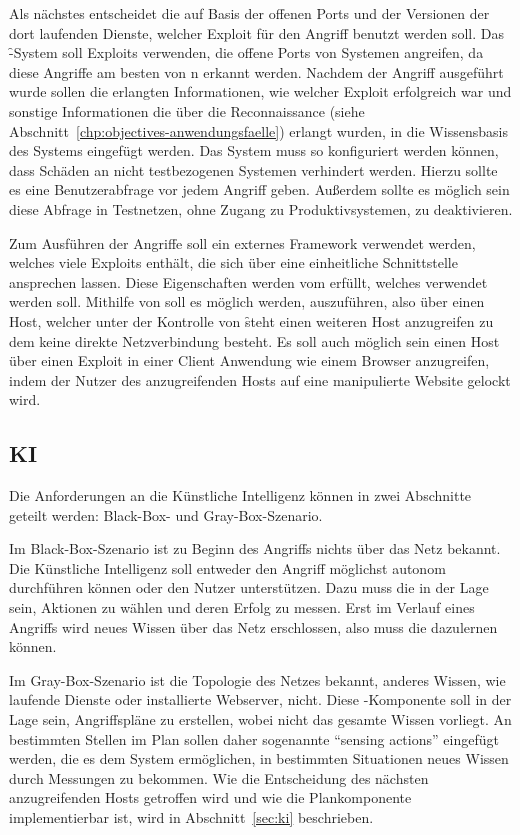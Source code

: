 Als nächstes entscheidet die  auf Basis der offenen Ports und der
Versionen der dort laufenden Dienste, welcher Exploit für den Angriff benutzt werden soll.
Das \f-System soll Exploits verwenden, die offene Ports von Systemen
angreifen, da diese Angriffe am besten von n erkannt werden.
Nachdem der Angriff ausgeführt wurde sollen die erlangten Informationen, wie
welcher Exploit erfolgreich war und sonstige Informationen die über die
Reconnaissance (siehe Abschnitt~\ref{chp:objectives-anwendungsfaelle}) erlangt wurden,
in die Wissensbasis des Systems eingefügt werden.
Das System muss so konfiguriert werden können, dass Schäden an nicht
testbezogenen Systemen verhindert werden. Hierzu sollte es eine Benutzerabfrage
vor jedem Angriff geben. Außerdem sollte es möglich sein diese Abfrage in
Testnetzen, ohne Zugang zu Produktivsystemen, zu deaktivieren.

Zum Ausführen der Angriffe soll ein externes Framework
verwendet werden, welches viele Exploits enthält, 
die sich über eine einheitliche Schnittstelle ansprechen lassen.
Diese Eigenschaften werden vom  erfüllt, welches verwendet werden soll.
Mithilfe von  soll es möglich werden,  auszuführen,
also über einen Host, welcher unter der Kontrolle von \f steht einen
weiteren Host anzugreifen zu dem keine direkte Netzverbindung besteht.
Es soll auch möglich sein einen Host über einen Exploit in einer Client
Anwendung wie einem Browser anzugreifen, indem \zB der Nutzer des anzugreifenden
Hosts auf eine manipulierte Website gelockt wird.

\subsection{KI}
\authors{\DK}{\LM \and \DE \and \MW \and \JF}
\label{chp:objectives-functions-ki}

Die Anforderungen an die Künstliche Intelligenz können in zwei
Abschnitte geteilt werden: Black-Box- und Gray-Box-Szenario.

Im Black-Box-Szenario ist zu Beginn des Angriffs nichts über das Netz
bekannt. Die Künstliche Intelligenz soll entweder den Angriff
möglichst autonom durchführen können oder den Nutzer unterstützen.
Dazu muss die  in der Lage sein, Aktionen zu wählen und deren
Erfolg zu messen. Erst im Verlauf eines Angriffs wird neues Wissen
über das Netz erschlossen, also muss die  dazulernen
können. 

Im Gray-Box-Szenario ist die Topologie des Netzes bekannt, 
anderes Wissen, wie laufende Dienste oder installierte
Webserver, nicht. Diese -Komponente soll in der Lage sein,
Angriffspläne zu erstellen, wobei nicht das gesamte Wissen vorliegt.
An bestimmten Stellen im Plan sollen daher sogenannte \enquote{sensing
actions} eingefügt werden, die es dem System ermöglichen, in
bestimmten Situationen neues Wissen durch Messungen zu bekommen.
Wie die Entscheidung des nächsten anzugreifenden Hosts getroffen wird
und wie die Plankomponente implementierbar ist, wird in Abschnitt~\ref{sec:ki}
beschrieben. 

